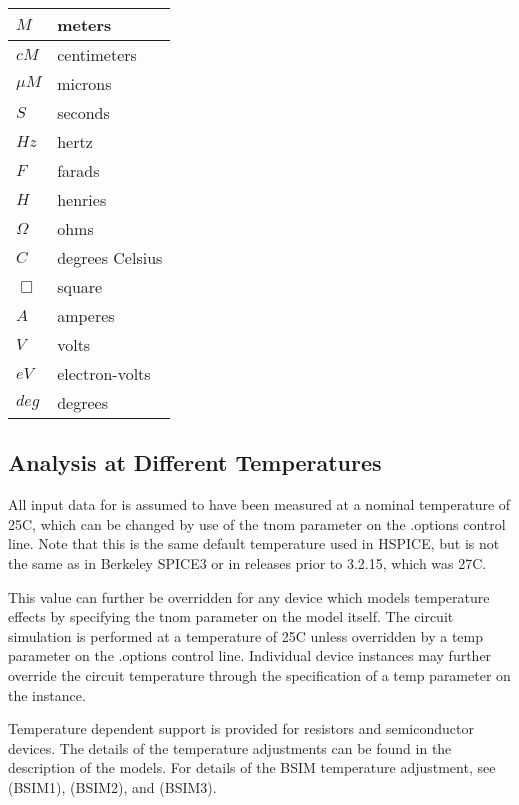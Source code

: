 \begin{tabular}{|l|l|}\hline
$M$       &  meters\\ \hline
$cM$      &  centimeters\\ \hline
${\mu}M$  &  microns\\ \hline
$S$       &  seconds\\ \hline
$Hz$      &  hertz\\ \hline
$F$       &  farads\\ \hline
$H$       &  henries\\ \hline
$\Omega$  &  ohms\\ \hline
$C$       &  degrees Celsius\\ \hline
$\Box$    &  square\\ \hline
$A$       &  amperes\\ \hline
$V$       &  volts\\ \hline
$eV$      &  electron-volts\\ \hline
$deg$     &  degrees\\ \hline
\end{tabular}

\subsection{Analysis at Different Temperatures}


All input data for {\WRspice} is assumed to have been measured at a
nominal temperature of 25C, which can be changed by use of the {\vt
tnom} parameter on the {\vt .options} control line.
Note that this is the same default temperature used in HSPICE, but is
not the same as in Berkeley SPICE3 or in {\WRspice} releases prior to
3.2.15, which was 27C.

This value can further be overridden for any device which models
temperature effects by specifying the {\vt tnom} parameter on the
model itself.  The circuit simulation is performed at a temperature of
25C unless overridden by a {\vt temp} parameter on the {\vt .options}
control line.  Individual device instances may further override the
circuit temperature through the specification of a {\vt temp}
parameter on the instance.

Temperature dependent support is provided for resistors and
semiconductor devices.  The details of the temperature adjustments can
be found in the description of the models.  For details of the BSIM
temperature adjustment, see \cite{park} (BSIM1), \cite{szeto} (BSIM2),
and \cite{bsim3} (BSIM3).

